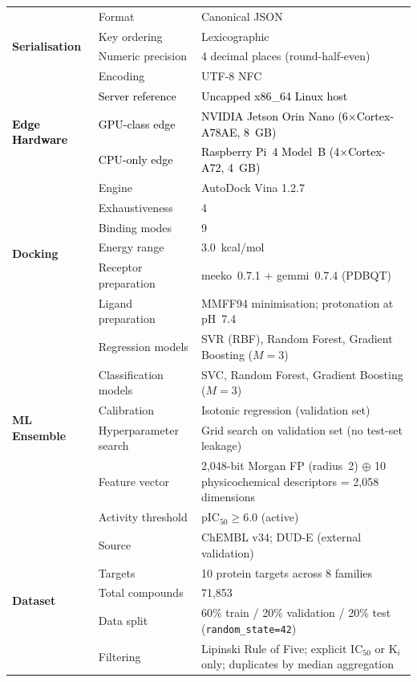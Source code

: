 \documentclass[conference]{IEEEtran}
\newcommand{\rev}[2]{#2}
\begin{document}
\begin{table}[!htbp]
{\begin{tabular}{p{2.6cm} p{2.8cm} p{4.5cm}}
\midrule
\multirow{4}{*}{\textbf{Serialisation}}
  & Format                & Canonical JSON \\
  & Key ordering          & Lexicographic \\
  & Numeric precision     & 4 decimal places (round-half-even) \\
  & Encoding              & UTF-8 NFC \\

\midrule
\multirow{3}{*}{\textcolor{black}{\textbf{Edge Hardware}}}
  & \textcolor{black}{Server reference} & \textcolor{black}{Uncapped x86\_64 Linux host} \\
  & \textcolor{black}{GPU-class edge}   & \textcolor{black}{NVIDIA Jetson Orin Nano (6$\times$Cortex-A78AE, 8~GB)} \\
  & \textcolor{black}{CPU-only edge}    & \textcolor{black}{Raspberry Pi~4 Model~B (4$\times$Cortex-A72, 4~GB)} \\

\midrule
\multirow{6}{*}{\textbf{Docking}}
  & Engine                & AutoDock Vina 1.2.7 \\
  & Exhaustiveness        & 4 \\
  & Binding modes         & 9 \\
  & Energy range          & 3.0~kcal/mol \\
  & Receptor preparation  & meeko~0.7.1 + gemmi~0.7.4 (PDBQT) \\
  & Ligand preparation    & MMFF94 minimisation; protonation at pH~7.4 \\

\midrule
\multirow{6}{*}{\textbf{ML Ensemble}}
  & Regression models     & \rev{R2.1}{SVR (RBF), Random Forest, Gradient Boosting ($M{=}3$)} \\
  & Classification models & SVC, Random Forest, Gradient Boosting ($M{=}3$) \\
  & Calibration           & Isotonic regression (validation set) \\
  & Hyperparameter search & Grid search on validation set (no test-set leakage) \\
  & Feature vector        & 2{,}048-bit Morgan FP (radius~2) $\oplus$ 10 physicochemical
                           descriptors = 2{,}058 dimensions \\
  & Activity threshold    & pIC$_{50} \geq 6.0$ (active) \\

\midrule
\multirow{5}{*}{\textbf{Dataset}}
  & Source                & ChEMBL v34; DUD-E (external validation) \\
  & Targets               & 10 protein targets across 8 families \\
  & Total compounds       & 71{,}853 \\
  & Data split            & 60\% train / 20\% validation / 20\% test
                           (\texttt{random\_state=42}) \\
  & Filtering             & Lipinski Rule of Five; explicit IC$_{50}$ or
                           K$_i$ only; duplicates by median aggregation \\


\end{tabular}}
\end{table}
\end{document}

